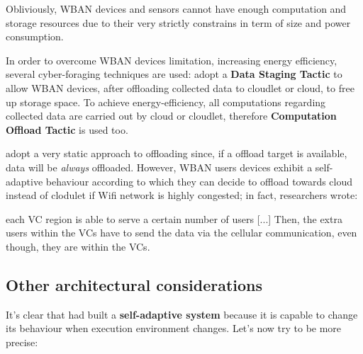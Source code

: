 \documentclass[sigchi]{acmart}
\begin{document}
\vspace{0.3cm}

Obliviously, WBAN devices and sensors cannot have enough computation and storage resources due to their very strictly constrains in term of size and power consumption. 

In order to overcome WBAN devices limitation, increasing energy efficiency, several cyber-foraging techniques are used: \citet{MSAReport} adopt a \textbf{Data Staging Tactic} to allow WBAN devices, after oﬄoading collected data to cloudlet or cloud, to free up storage space. To achieve energy-efficiency, all computations regarding collected data are carried out by cloud or cloudlet, therefore \textbf{Computation Offload Tactic} is used too.

\citet{MSAReport} adopt a very static approach to offloading since, if a offload target is available, data will be \textit{always} offloaded. 
However, WBAN users devices exhibit a self-adaptive behaviour according to which they can decide to offload towards cloud instead of clodulet if Wifi network is highly congested; in fact, researchers wrote:

\vspace{0.3cm}

\begin{quoting}[font=itshape, begintext={``}, endtext={''\cite[par.~5.1]{MSAReport}}]
each VC region is able to serve a certain number of users [...] Then, the extra users within the VCs have to send the data via the cellular communication, even though, they are within the VCs. 
\end{quoting}

\vspace{0.3cm}

\subsection{Other architectural considerations}

It's clear that \citet{MSAReport} had built a \textbf{self-adaptive system} because it is capable to change its behaviour when execution environment changes. Let's now try to be more precise:
\end{document}

